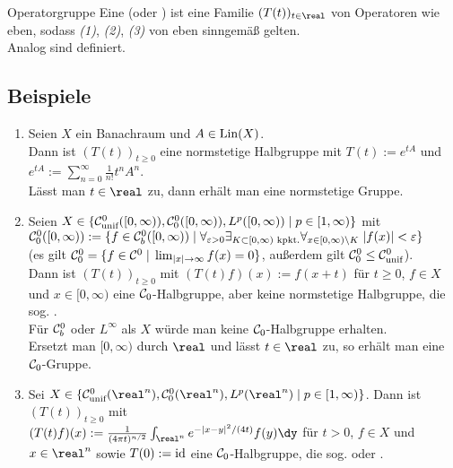 \begin{Def}{Operatorgruppe}
    Eine  (oder ) ist
    eine Familie $(T(t))_{t \in \real}$ von Operatoren wie eben,
    sodass \emph{(1)}, \emph{(2)}, \emph{(3)} von eben sinngemäß gelten.\\
    Analog sind  definiert.
\end{Def}

\pagebreak

\subsection{%
    Beispiele%
}

\begin{Bsp}
    \begin{enumerate}[label=\emph{(\alph*)}]
        \item
        Seien $X$ ein Banachraum und $A \in \operatorname{Lin}(X)$.\\
        Dann ist $(T(t))_{t \ge 0}$ eine normstetige Halbgruppe
        mit $T(t) := e^{tA}$ und $e^{tA} := \sum_{n=0}^\infty \frac{1}{n!} t^n A^n$.\\
        Lässt man $t \in \real$ zu, dann erhält man eine normstetige Gruppe.

        \item
        Seien $X \in \{\mathcal{C}^0_{\text{unif}}([0, \infty)), \mathcal{C}^0_0([0, \infty)), L^p([0,\infty)) \;|\;
        p \in [1, \infty)\}$ mit\\
        $\mathcal{C}^0_0([0, \infty)) := \{f \in \mathcal{C}^0_b([0, \infty)) \;|\; \forall_{\varepsilon>0}
        \exists_{K \subset [0, \infty) \text{ kpkt.}} \forall_{x \in [0, \infty) \setminus K}\;
        |f(x)| < \varepsilon\}$\\
        (es gilt $\mathcal{C}^0_0 = \{f \in \mathcal{C}^0 \;|\; \lim_{|x| \to \infty} f(x) = 0\}$,
        außerdem gilt $\mathcal{C}^0_0 \le \mathcal{C}^0_{\text{unif}}$).\\
        Dann ist $(T(t))_{t \ge 0}$ mit $(T(t) f)(x) := f(x + t)$
        für $t \ge 0$, $f \in X$ und $x \in [0, \infty)$
        eine $\mathcal{C}_0$-Halbgruppe, aber keine normstetige Halbgruppe,
        die sog. .\\
        Für $\mathcal{C}^0_b$ oder $L^\infty$ als $X$ würde man keine $\mathcal{C}_0$-Halbgruppe erhalten.\\
        Ersetzt man $[0, \infty)$ durch $\real$ und lässt $t \in \real$ zu,
        so erhält man eine $\mathcal{C}_0$-Gruppe.

        \item
        Sei $X \in \{\C^0_\unif(\real^n), \C^0_0(\real^n), L^p(\real^n) \;|\; p \in [1, \infty)\}$.
        Dann ist $(T(t))_{t \ge 0}$ mit\\
        $(T(t) f)(x) := \frac{1}{(4\pi t)^{n/2}} \int_{\real^n} e^{-|x-y|^2/(4t)} f(y)\dy$
        für $t > 0$, $f \in X$ und $x \in \real^n$ sowie $T(0) := \text{id}$
        eine $\mathcal{C}_0$-Halbgruppe, die sog.  oder
        .
    \end{enumerate}
\end{Bsp}

